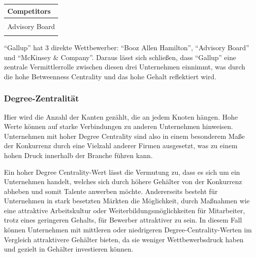 \documentclass[
]{article}
\begin{document}
\begin{tabular}{>{\raggedright\arraybackslash}p{5cm}}
\toprule
Competitors\\
\midrule
\cellcolor{gray!10}{Booz Allen Hamilton}\\
Advisory Board\\
\cellcolor{gray!10}{McKinsey \& Company}\\
\bottomrule
\end{tabular}

``Gallup'' hat 3 direkte Wettbewerber: ``Booz Allen Hamilton'',
``Advisory Board'' und ``McKinsey \& Company''. Daraus lässt sich
schließen, dass ``Gallup'' eine zentrale Vermittlerrolle zwischen diesen
drei Unternehmen einnimmt, was durch die hohe Betweenness Centrality und
das hohe Gehalt reflektiert wird.

\subsubsection{Degree-Zentralität}\label{degree-zentralituxe4t}

Hier wird die Anzahl der Kanten gezählt, die an jedem Knoten hängen.
Hohe Werte können auf starke Verbindungen zu anderen Unternehmen
hinweisen. Unternehmen mit hoher Degree Centrality sind also in einem
besonderem Maße der Konkurrenz durch eine Vielzahl anderer Firmen
ausgesetzt, was zu einem hohen Druck innerhalb der Branche führen kann.

Ein hoher Degree Centrality-Wert lässt die Vermutung zu, dass es sich um
ein Unternehmen handelt, welches sich durch höhere Gehälter von der
Konkurrenz abheben und somit Talente anwerben möchte. Andererseits
besteht für Unternehmen in stark besetzten Märkten die Möglichkeit,
durch Maßnahmen wie eine attraktive Arbeitskultur oder
Weiterbildungsmöglichkeiten für Mitarbeiter, trotz eines geringeren
Gehalts, für Bewerber attraktiver zu sein. In diesem Fall können
Unternehmen mit mittleren oder niedrigeren Degree-Centrality-Werten im
Vergleich attraktivere Gehälter bieten, da sie weniger Wettbewerbsdruck
haben und gezielt in Gehälter investieren können.
\end{document}
